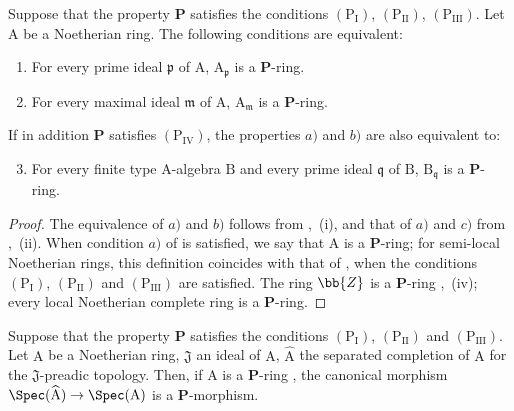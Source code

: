 
\begin{corollary}[7.4.5]
\label{IV.7.4.5}
Suppose that the property $\boldsymbol{P}$ satisfies the conditions $(\mathrm{P_I})$, $(\mathrm{P_{II}})$, $(\mathrm{P_{III}})$.
Let $\mathrm{A}$ be a Noetherian ring.
The following conditions are equivalent:
\begin{enumerate}[label=\emph{\alph*)}]
  \item For every prime ideal $\mathfrak{p}$ of $\mathrm{A}$, $\mathrm{A}_\mathfrak{p}$ is a $\boldsymbol{P}$-ring.
  \item For every maximal ideal $\mathfrak{m}$ of $\mathrm{A}$, $\mathrm{A}_\mathfrak{m}$ is a $\boldsymbol{P}$-ring.
\end{enumerate}
If in addition $\boldsymbol{P}$ satisfies $(\mathrm{P_{IV}})$, the properties $a)$ and $b)$ are also equivalent to:
\begin{enumerate}[label=\emph{\alph*)}]
  \setcounter{enumi}{2}
  \item For every finite type A-algebra $\mathrm{B}$ and every prime ideal $\mathfrak{q}$ of $\mathrm{B}$, $\mathrm{B}_\mathfrak{q}$ is a $\boldsymbol{P}$-ring.
\end{enumerate}
\end{corollary}

\begin{proof}
The equivalence of $a)$ and $b)$ follows from ,~(i), and that of $a)$ and $c)$ from ,~(ii).
When condition $a)$ of  is satisfied, we say that $\mathrm{A}$ is a $\boldsymbol{P}$-ring; for semi-local Noetherian rings, this definition coincides with that of , when the conditions $(\mathrm{P_I})$, $(\mathrm{P_{II}})$ and $(\mathrm{P_{III}})$ are satisfied.
The ring $\bb{Z}$ is a $\boldsymbol{P}$-ring ,~(iv); every local Noetherian complete ring is a $\boldsymbol{P}$-ring.
\end{proof}

\begin{proposition}[7.4.6]
\label{IV.7.4.6}
Suppose that the property $\boldsymbol{P}$ satisfies the conditions $(\mathrm{P_I})$, $(\mathrm{P_{II}})$ and $(\mathrm{P_{III}})$.
Let $\mathrm{A}$ be a Noetherian ring, $\mathfrak{J}$ an ideal of $\mathrm{A}$, $\widehat{\mathrm{A}}$ the separated completion of $\mathrm{A}$ for the $\mathfrak{J}$-preadic topology.
Then, if $\mathrm{A}$ is a $\boldsymbol{P}$-ring , the canonical morphism $\Spec(\widehat{\mathrm{A}})\to\Spec(\mathrm{A})$ is a $\boldsymbol{P}$-morphism.
\end{proposition}

